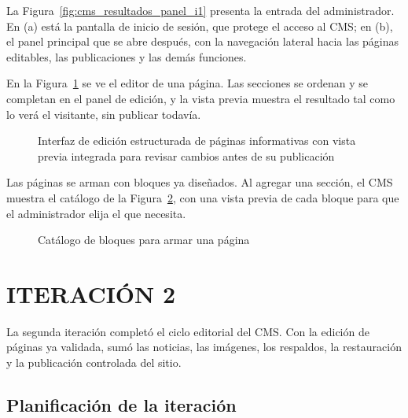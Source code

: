 
La Figura~\ref{fig:cms_resultados_panel_i1} presenta la entrada del administrador. En (a) está la pantalla de inicio de sesión, que protege el acceso al CMS; en (b), el panel principal que se abre después, con la navegación lateral hacia las páginas editables, las publicaciones y las demás funciones.


En la Figura~\ref{fig:cms_resultados_editor_i1} se ve el editor de una página. Las secciones se ordenan y se completan en el panel de edición, y la vista previa muestra el resultado tal como lo verá el visitante, sin publicar todavía.

\begin{figure}[htbp]
\centering
{}
\caption[Editor de contenido con vista previa]{Interfaz de edición estructurada de páginas informativas con vista previa integrada para revisar cambios antes de su publicación}
\label{fig:cms_resultados_editor_i1}
\end{figure}

Las páginas se arman con bloques ya diseñados. Al agregar una sección, el CMS muestra el catálogo de la Figura~\ref{fig:cms_bloques}, con una vista previa de cada bloque para que el administrador elija el que necesita.

\begin{figure}[htbp]
\centering
{}
\caption{Catálogo de bloques para armar una página}
\label{fig:cms_bloques}
\end{figure}

\section{ITERACIÓN 2}

La segunda iteración completó el ciclo editorial del CMS. Con la edición de páginas ya validada, sumó las noticias, las imágenes, los respaldos, la restauración y la publicación controlada del sitio.

\subsection{Planificación de la iteración}

